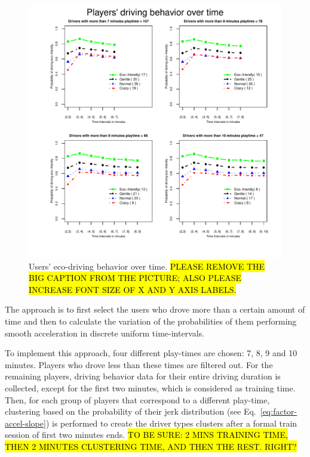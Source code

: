 \documentclass[preprint,authoryear,12pt]{elsarticle}
\begin{document}
\begin{figure}[!tb]
	\centering
	\includegraphics[width=1\linewidth]{ijhcs14-img/Evolution.pdf}
	\caption{Users' eco-driving behavior over time. \hl{PLEASE REMOVE THE BIG CAPTION FROM THE PICTURE; ALSO PLEASE INCREASE FONT SIZE OF X AND Y AXIS LABELS.}
}
	\label{fig:evolution}
\end{figure}

The approach is to first select the users who drove more than a certain amount of time and then to calculate the variation of the probabilities of them performing smooth acceleration in discrete uniform time-intervals.

To implement this approach, four different play-times are chosen: 7, 8, 9 and 10 minutes. Players who drove less than these times are filtered out. For the remaining players, driving behavior data for their entire driving duration is collected, except for the first two minutes, which is considered as training time.
Then, for each group of players that correspond to a different play-time, clustering based on the probability of their jerk distribution (see Eq.~\ref{eq:factor-accel-slope}) is performed to create the driver types clusters after a formal train session of first two minutes ends. \hl{TO BE SURE: 2 MINS TRAINING TIME, THEN 2 MINUTES CLUSTERING TIME, AND THEN THE REST. RIGHT?}
\end{document}
